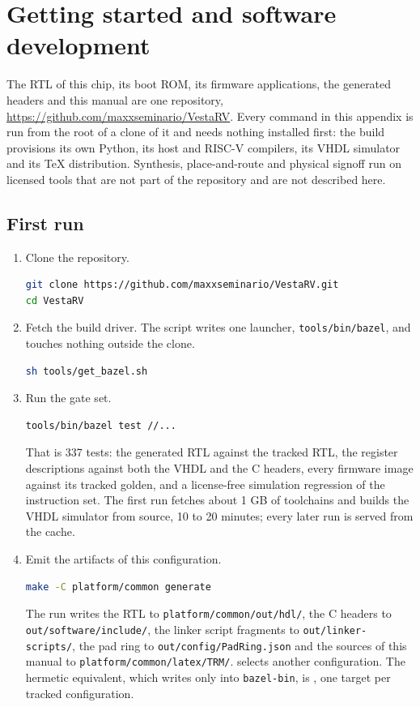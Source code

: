 \documentclass[11pt,pdftex,openany,letterpaper]{report}
\begin{document}
\clearpage



\appendix

\chapter{Getting started and software development} \label{s:software}

The RTL of this chip, its boot ROM, its firmware applications, the generated headers and this manual are one repository, \url{https://github.com/maxxseminario/VestaRV}. Every command in this appendix is run from the root of a clone of it and needs nothing installed first: the build provisions its own Python, its host and RISC-V compilers, its VHDL simulator and its \TeX{} distribution. Synthesis, place-and-route and physical signoff run on licensed tools that are not part of the repository and are not described here.

\section{First run} \label{ss:swfirstrun}

\begin{enumerate}[itemsep=1pt]
	\item Clone the repository.
\begin{lstlisting}[language=bash]
git clone https://github.com/maxxseminario/VestaRV.git
cd VestaRV
\end{lstlisting}
	\item Fetch the build driver. The script writes one launcher, \texttt{tools/bin/bazel}, and touches nothing outside the clone.
\begin{lstlisting}[language=bash]
sh tools/get_bazel.sh
\end{lstlisting}
	\item Run the gate set.
\begin{lstlisting}[language=bash]
tools/bin/bazel test //...
\end{lstlisting}
	That is 337 tests: the generated RTL against the tracked RTL, the register descriptions against both the VHDL and the C headers, every firmware image against its tracked golden, and a license-free simulation regression of the instruction set. The first run fetches about 1 GB of toolchains and builds the VHDL simulator from source, 10 to 20 minutes; every later run is served from the cache.
	\item Emit the artifacts of this configuration.
\begin{lstlisting}[language=bash]
make -C platform/common generate
\end{lstlisting}
	The run writes the RTL to \texttt{platform/common/out/hdl/}, the C headers to \texttt{out/software/include/}, the linker script fragments to \texttt{out/linker-scripts/}, the pad ring to \texttt{out/config/PadRing.json} and the sources of this manual to \texttt{platform/common/latex/TRM/}.  selects another configuration. The hermetic equivalent, which writes only into \texttt{bazel-bin}, is , one target per tracked configuration.
\end{enumerate}
\end{document}
